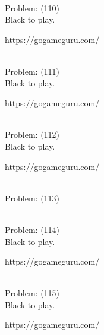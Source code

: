 \documentclass[11pt]{article}
\begin{document}
\begin{minipage}[t]{0.5\textwidth}
  {\centering
  
\\
  Problem: (110)\\
  Black to play.

https://gogameguru.com/\\
  }
\end{minipage}
\begin{minipage}[t]{0.5\textwidth}
  {\centering
  
\\
  Problem: (111)\\
  Black to play.

https://gogameguru.com/\\
  }
\end{minipage}
\begin{minipage}[t]{0.5\textwidth}
  {\centering
  
\\
  Problem: (112)\\
  Black to play.

https://gogameguru.com/\\
  }
\end{minipage}
\begin{minipage}[t]{0.5\textwidth}
  {\centering
  
\\
  Problem: (113)\\
  
  }
\end{minipage}
\begin{minipage}[t]{0.5\textwidth}
  {\centering
  
\\
  Problem: (114)\\
  Black to play.

https://gogameguru.com/\\
  }
\end{minipage}
\begin{minipage}[t]{0.5\textwidth}
  {\centering
  
\\
  Problem: (115)\\
  Black to play.

https://gogameguru.com/\\
  }
\end{minipage}
\end{document}
